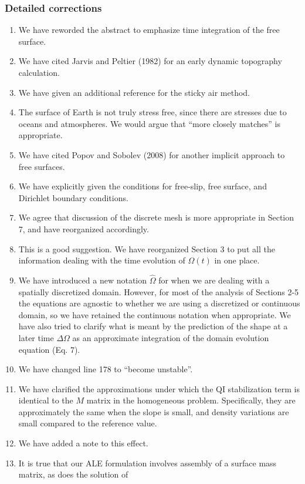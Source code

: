 \documentclass[a4paper,12pt]{article}
\begin{document}
\subsubsection*{Detailed corrections}
\begin{enumerate}
  \item We have reworded the abstract to emphasize time integration of the free surface.
  \item We have cited Jarvis and Peltier (1982) for an early dynamic topography calculation.
  \item We have given an additional reference for the sticky air method.
  \item The surface of Earth is not truly stress free, since there are stresses due to oceans and atmospheres.
    We would argue that ``more closely matches'' is appropriate.
  \item We have cited Popov and Sobolev (2008) for another implicit approach to free surfaces.
  \item We have explicitly given the conditions for free-slip, free surface, and Dirichlet boundary conditions.
  \item We agree that discussion of the discrete mesh is more appropriate in Section 7, and have reorganized accordingly.
  \item This is a good suggestion. We have reorganized Section 3 to put all the information dealing with
    the time evolution of $\Omega(t)$ in one place.
  \item We have introduced a new notation $\hat{\Omega}$ for when we are dealing with a spatially discretized domain.
However, for most of the analysis of Sections 2-5 the equations are agnostic to whether we are using a discretized
or continuous domain, so we have retained the continuous notation when appropriate. We have also tried to clarify
what is meant by the prediction of the shape at a later time $\Delta \Omega$ as an approximate integration of the
domain evolution equation (Eq. 7).
  \item We have changed line 178 to ``become unstable''.
  \item We have clarified the approximations under which the QI stabilization term is identical to
the $M$ matrix in the homogeneous problem. Specifically, they are approximately the same when the slope is small,
and density variations are small compared to the reference value.
  \item We have added a note to this effect.
  \item It is true that our ALE formulation involves assembly of a surface mass matrix, as does the solution of

\end{enumerate}
\end{document}
